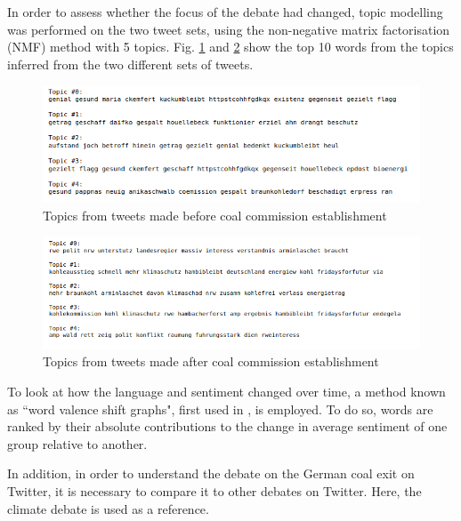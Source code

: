 \documentclass[10pt,twocolumn,twoside,lineno]{pnas-new}
\begin{document}
In order to assess whether the focus of the debate had changed, topic modelling was performed on the two tweet sets, using the non-negative matrix factorisation (NMF) method with 5 topics. Fig. \ref{fig:topics_before} and \ref{fig:topics_after} show the top 10 words from the topics inferred from the two different sets of tweets. 

\begin{figure} 
	\begin{center}
		\includegraphics[width=\linewidth]{figures/topics_before}
	\end{center}
	\caption{Topics from tweets made before coal commission establishment}
	\label{fig:topics_before}
\end{figure}
 
\begin{figure} 
	\begin{center}
		\includegraphics[width=\linewidth]{figures/topics_after}
	\end{center}
	\caption{Topics from tweets made after coal commission establishment}
	\label{fig:topics_after}
\end{figure}

To look at how the language and sentiment changed over time, a method known as ``word valence shift graphs", first used in \cite{Dodds2011}, is employed. To do so, words are ranked by their absolute contributions to the change in average sentiment of one group relative to another. 

In addition, in order to understand the debate on the German coal exit on Twitter, it is necessary to compare it to other debates on Twitter. Here, the climate debate is used as a reference. 
\end{document}
